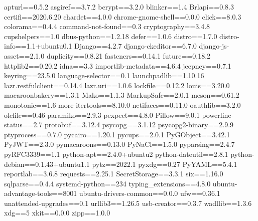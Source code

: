 apturl==0.5.2
asgiref==3.7.2
bcrypt==3.2.0
blinker==1.4
Brlapi==0.8.3
certifi==2020.6.20
chardet==4.0.0
chrome-gnome-shell==0.0.0
click==8.0.3
colorama==0.4.4
command-not-found==0.3
cryptography==3.4.8
cupshelpers==1.0
dbus-python==1.2.18
defer==1.0.6
distro==1.7.0
distro-info==1.1+ubuntu0.1
Django==4.2.7
django-ckeditor==6.7.0
django-js-asset==2.1.0
duplicity==0.8.21
fasteners==0.14.1
future==0.18.2
httplib2==0.20.2
idna==3.3
importlib-metadata==4.6.4
jeepney==0.7.1
keyring==23.5.0
language-selector==0.1
launchpadlib==1.10.16
lazr.restfulclient==0.14.4
lazr.uri==1.0.6
lockfile==0.12.2
louis==3.20.0
macaroonbakery==1.3.1
Mako==1.1.3
MarkupSafe==2.0.1
meson==0.61.2
monotonic==1.6
more-itertools==8.10.0
netifaces==0.11.0
oauthlib==3.2.0
olefile==0.46
paramiko==2.9.3
pexpect==4.8.0
Pillow==9.0.1
powerline-status==2.7
protobuf==3.12.4
psycopg==3.1.12
psycopg2-binary==2.9.9
ptyprocess==0.7.0
pycairo==1.20.1
pycups==2.0.1
PyGObject==3.42.1
PyJWT==2.3.0
pymacaroons==0.13.0
PyNaCl==1.5.0
pyparsing==2.4.7
pyRFC3339==1.1
python-apt==2.4.0+ubuntu2
python-dateutil==2.8.1
python-debian==0.1.43+ubuntu1.1
pytz==2022.1
pyxdg==0.27
PyYAML==5.4.1
reportlab==3.6.8
requests==2.25.1
SecretStorage==3.3.1
six==1.16.0
sqlparse==0.4.4
systemd-python==234
typing_extensions==4.8.0
ubuntu-advantage-tools==8001
ubuntu-drivers-common==0.0.0
ufw==0.36.1
unattended-upgrades==0.1
urllib3==1.26.5
usb-creator==0.3.7
wadllib==1.3.6
xdg==5
xkit==0.0.0
zipp==1.0.0
